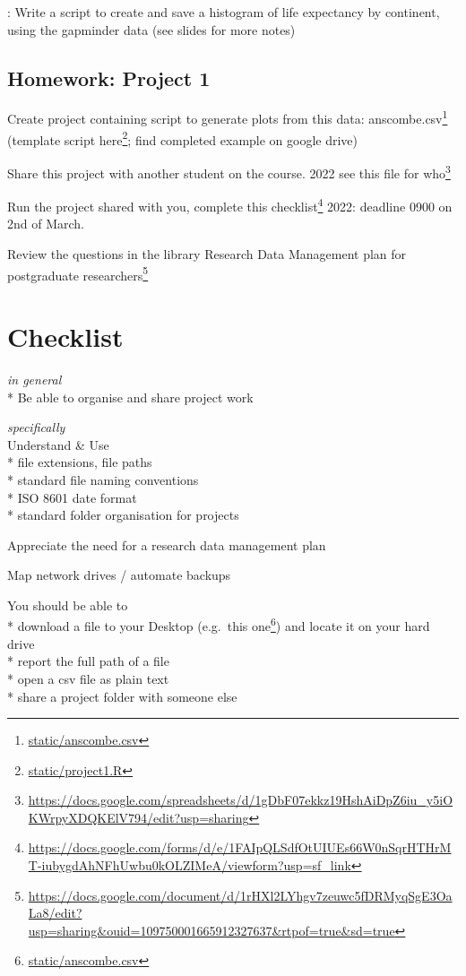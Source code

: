 \documentclass[
  12pt,
  a5paper,
]{book}
\DeclareRobustCommand{\href}[2]{#2\footnote{\url{#1}}}
\begin{document}
: Write a script to create and save a histogram of life expectancy by continent, using the gapminder data (see slides for more notes)

\hypertarget{homework-project-1}{%
\subsection{Homework: Project 1}\label{homework-project-1}}

Create project containing script to generate plots from this data: \href{static/anscombe.csv}{anscombe.csv} (template script \href{static/project1.R}{here}; find completed example on google drive)

Share this project with another student on the course. \href{https://docs.google.com/spreadsheets/d/1gDbF07ekkz19HshAiDpZ6iu_y5iOKWrpyXDQKElV794/edit?usp=sharing}{2022 see this file for who}

Run the project shared with you, complete \href{https://docs.google.com/forms/d/e/1FAIpQLSdfOtUIUEs66W0nSqrHTHrMT-iubygdAhNFhUwbu0kOLZIMeA/viewform?usp=sf_link}{this checklist} 2022: deadline 0900 on 2nd of March.

Review the questions in the library \href{https://docs.google.com/document/d/1rHXl2LYhgv7zeuwc5fDRMyqSgE3OaLa8/edit?usp=sharing\&ouid=109750001665912327637\&rtpof=true\&sd=true}{Research Data Management plan for postgraduate researchers}

\hypertarget{checklist-2}{%
\section{Checklist}\label{checklist-2}}

\emph{in general}\\
* Be able to organise and share project work

\emph{specifically}\\
Understand \& Use\\
* file extensions, file paths\\
* standard file naming conventions\\
* ISO 8601 date format\\
* standard folder organisation for projects

Appreciate the need for a research data management plan

Map network drives / automate backups

You should be able to\\
* download a file to your Desktop (e.g.~\href{static/anscombe.csv}{this one}) and locate it on your hard drive\\
* report the full path of a file\\
* open a csv file as plain text\\
* share a project folder with someone else
\end{document}

